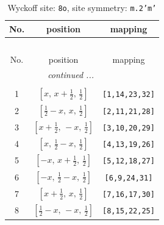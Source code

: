 \documentclass[fleqn,8pt]{jsarticle}
\begin{document}
\begin{longtable}{ccc}
\caption{Wyckoff site: {\tt 8o}, site symmetry: {\tt m.2'm'}}
 \\
 \hline \hline
No. & position & mapping \\ \hline \endfirsthead

\multicolumn{2}{l}{\tablename\ \thetable{}} \\
 \hline \hline
No. & position & mapping \\ \hline \endhead

 \hline \hline
\multicolumn{2}{r}{\footnotesize\it continued ...} \\ \endfoot

 \hline \hline
\multicolumn{2}{r}{} \\ \endlastfoot

1 & $\left[ x,\, x + \frac{1}{2},\, \frac{1}{2} \right]$ & {\tt [1,14,23,32]} \\ \hline
2 & $\left[ \frac{1}{2} - x,\, x,\, \frac{1}{2} \right]$ & {\tt [2,11,21,28]} \\ \hline
3 & $\left[ x + \frac{1}{2},\, - x,\, \frac{1}{2} \right]$ & {\tt [3,10,20,29]} \\ \hline
4 & $\left[ x,\, \frac{1}{2} - x,\, \frac{1}{2} \right]$ & {\tt [4,13,19,26]} \\ \hline
5 & $\left[ - x,\, x + \frac{1}{2},\, \frac{1}{2} \right]$ & {\tt [5,12,18,27]} \\ \hline
6 & $\left[ - x,\, \frac{1}{2} - x,\, \frac{1}{2} \right]$ & {\tt [6,9,24,31]} \\ \hline
7 & $\left[ x + \frac{1}{2},\, x,\, \frac{1}{2} \right]$ & {\tt [7,16,17,30]} \\ \hline
8 & $\left[ \frac{1}{2} - x,\, - x,\, \frac{1}{2} \right]$ & {\tt [8,15,22,25]} \\
\end{longtable}
\renewcommand{\arraystretch}{1.2}
\end{document}
